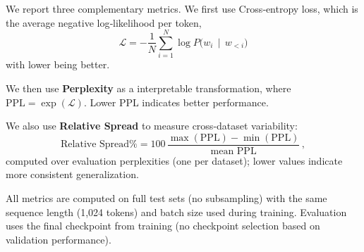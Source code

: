 We report three complementary metrics. We first use Cross‑entropy loss, which is the average negative log‑likelihood per token,
\begin{equation*}
    \mathcal{L} = -\frac{1}{N}\sum_{i=1}^{N} \log P\bigl(w_i \,\mid\, w_{<i}\bigr)
\end{equation*}
with lower being better. 

We then use \textbf{Perplexity} as a interpretable transformation, where $\text{PPL}=\exp(\mathcal{L})$. Lower PPL indicates better performance.

We also use \textbf{Relative Spread} to measure cross‑dataset variability:
\begin{equation*}
    \text{Relative Spread}\% = 100\,\frac{\max(\text{PPL}) - \min(\text{PPL})}{\text{mean PPL}}\, ,
\end{equation*}
computed over evaluation perplexities (one per dataset); lower values indicate more consistent generalization.

All metrics are computed on full test sets (no subsampling) with the same sequence length (1,024 tokens) and batch size used during training. Evaluation uses the final checkpoint from training (no checkpoint selection based on validation performance).
